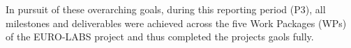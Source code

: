 In pursuit of these overarching goals,
during this reporting period (P3), all milestones and deliverables  were achieved across the five Work Packages (WPs) of the EURO-LABS project and thus completed the projects gaols fully.

